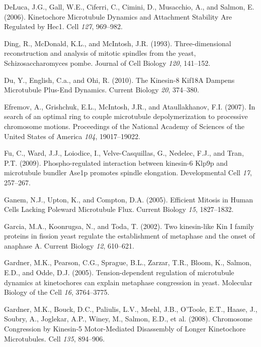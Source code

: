 \documentclass[12pt,a4paper,twoside,openright]{book}
\begin{document}
DeLuca, J.G., Gall, W.E., Ciferri, C., Cimini, D., Musacchio, A., and
Salmon, E. (2006). Kinetochore Microtubule Dynamics and Attachment
Stability Are Regulated by Hec1. Cell \emph{127}, 969--982.

Ding, R., McDonald, K.L., and McIntosh, J.R. (1993). Three-dimensional
reconstruction and analysis of mitotic spindles from the yeast,
Schizosaccharomyces pombe. Journal of Cell Biology \emph{120}, 141--152.

Du, Y., English, C.a., and Ohi, R. (2010). The Kinesin-8 Kif18A Dampens
Microtubule Plus-End Dynamics. Current Biology \emph{20}, 374--380.

Efremov, A., Grishchuk, E.L., McIntosh, J.R., and Ataullakhanov, F.I.
(2007). In search of an optimal ring to couple microtubule
depolymerization to processive chromosome motions. Proceedings of the
National Academy of Sciences of the United States of America \emph{104},
19017--19022.

Fu, C., Ward, J.J., Loiodice, I., Velve-Casquillas, G., Nedelec, F.J.,
and Tran, P.T. (2009). Phospho-regulated interaction between kinesin-6
Klp9p and microtubule bundler Ase1p promotes spindle elongation.
Developmental Cell \emph{17}, 257--267.

Ganem, N.J., Upton, K., and Compton, D.A. (2005). Efficient Mitosis in
Human Cells Lacking Poleward Microtubule Flux. Current Biology
\emph{15}, 1827--1832.

Garcia, M.A., Koonrugsa, N., and Toda, T. (2002). Two kinesin-like Kin I
family proteins in fission yeast regulate the establishment of metaphase
and the onset of anaphase A. Current Biology \emph{12}, 610--621.

Gardner, M.K., Pearson, C.G., Sprague, B.L., Zarzar, T.R., Bloom, K.,
Salmon, E.D., and Odde, D.J. (2005). Tension-dependent regulation of
microtubule dynamics at kinetochores can explain metaphase congression
in yeast. Molecular Biology of the Cell \emph{16}, 3764--3775.

Gardner, M.K., Bouck, D.C., Paliulis, L.V., Meehl, J.B., O'Toole, E.T.,
Haase, J., Soubry, A., Joglekar, A.P., Winey, M., Salmon, E.D., et al.
(2008). Chromosome Congression by Kinesin-5 Motor-Mediated Disassembly
of Longer Kinetochore Microtubules. Cell \emph{135}, 894--906.
\end{document}
